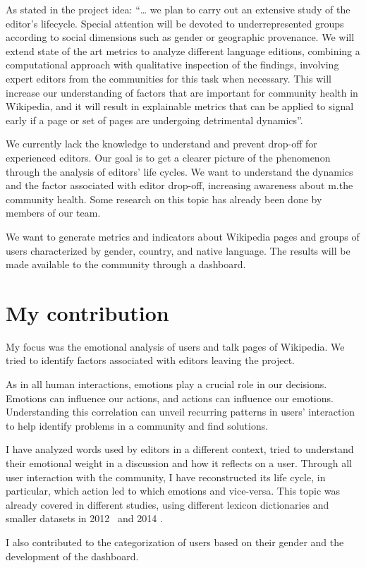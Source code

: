 As stated in the project idea: “… we plan to carry out an extensive study of the editor’s lifecycle. Special attention will be devoted to underrepresented groups according to social dimensions such as gender or geographic provenance. We will extend state of the art metrics to analyze different language editions, combining a computational approach with qualitative inspection of the findings, involving expert editors from the communities for this task when necessary. This will increase our understanding of factors that are important for community health in Wikipedia, and it will result in explainable metrics that can be applied to signal early if a page or set of pages are undergoing detrimental dynamics”.


We currently lack the knowledge to understand and prevent drop-off for experienced editors. Our goal is to get a clearer picture of the phenomenon through the analysis of editors’ life cycles. We want to understand the dynamics and the factor associated with editor drop-off, increasing awareness about m.the community health. Some research on this topic has already been done by members of our team\cite{miquelwikipedia}.

We want to generate metrics and indicators about Wikipedia pages and groups of users characterized by gender, country, and native language. The results will be made available to the community through a dashboard.

\section{My contribution}
\label{sec:problem}

My focus was the emotional analysis of users and talk pages of Wikipedia. We tried to identify factors associated with editors leaving the project.

As in all human interactions, emotions play a crucial role in our decisions. Emotions can influence our actions, and actions can influence our emotions. Understanding this correlation can unveil recurring patterns in users' interaction to help identify problems in a community and find solutions.


I have analyzed words used by editors in a different context, tried to understand their emotional weight in a discussion and how it reflects on a user. Through all user interaction with the community, I have reconstructed its life cycle, in particular, which action led to which emotions and vice-versa. This topic was already covered in different studies, using different lexicon dictionaries and smaller datasets in 2012~\cite{laniado2012emotions} and 2014 \cite{iosub2014emotions}.


I also contributed to the categorization of users based on their gender and the development of the dashboard.

